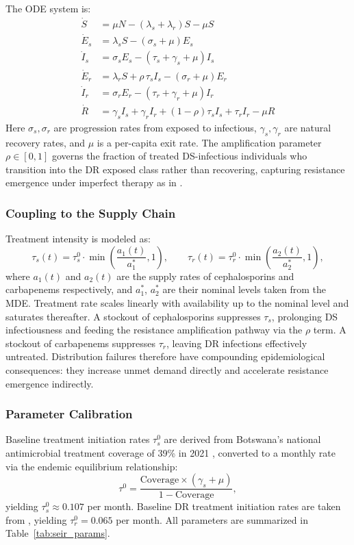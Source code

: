 \documentclass{article}
\begin{document}
The ODE system is:
\begin{align}
\dot{S} &= \mu N - (\lambda_s + \lambda_r)S - \mu S \\
\dot{E}_s &= \lambda_s S - (\sigma_s + \mu)E_s \\
\dot{I}_s &= \sigma_s E_s - (\tau_s + \gamma_s + \mu)I_s \\
\dot{E}_r &= \lambda_r S + \rho\,\tau_s I_s - (\sigma_r + \mu)E_r \\
\dot{I}_r &= \sigma_r E_r - (\tau_r + \gamma_r + \mu)I_r \\
\dot{R} &= \gamma_s I_s + \gamma_r I_r + (1-\rho)\tau_s I_s + \tau_r I_r - \mu R
\end{align}
Here $\sigma_s, \sigma_r$ are progression rates from exposed to infectious, $\gamma_s, \gamma_r$ are natural recovery rates, and $\mu$ is a per-capita exit rate. The amplification parameter $\rho \in [0,1]$ governs the fraction of treated DS-infectious individuals who transition into the DR exposed class rather than recovering, capturing resistance emergence under imperfect therapy as in \cite{kd20}.

\subsubsection{Coupling to the Supply Chain}

Treatment intensity is modeled as:
\[
\tau_s(t) = \tau^0_s \cdot \min\!\left(\frac{a_1(t)}{a^*_1}, 1\right),
\qquad
\tau_r(t) = \tau^0_r \cdot \min\!\left(\frac{a_2(t)}{a^*_2}, 1\right),
\]
where $a_1(t)$ and $a_2(t)$ are the supply rates of cephalosporins and carbapenems respectively, and $a^*_1$, $a^*_2$ are their nominal levels taken from the MDE. Treatment rate scales linearly with availability up to the nominal level and saturates thereafter. A stockout of cephalosporins suppresses $\tau_s$, prolonging DS infectiousness and feeding the resistance amplification pathway via the $\rho$ term. A stockout of carbapenems suppresses $\tau_r$, leaving DR infections effectively untreated. Distribution failures therefore have compounding epidemiological consequences: they increase unmet demand directly and accelerate resistance emergence indirectly.

\subsubsection{Parameter Calibration}

Baseline treatment initiation rates $\tau^0_s$ are derived from Botswana's national antimicrobial treatment coverage of 39\% in 2021 \cite{sejie2023}, converted to a monthly rate via the endemic equilibrium relationship:
\[
\tau^0 = \frac{\text{Coverage} \times (\gamma_s + \mu)}{1 - \text{Coverage}},
\]
yielding $\tau^0_s \approx 0.107$ per month. Baseline DR treatment initiation rates are taken from \cite{kd20}, yielding $\tau^0_r = 0.065$ per month. All parameters are summarized in Table~\ref{tab:seir_params}.
\end{document}
